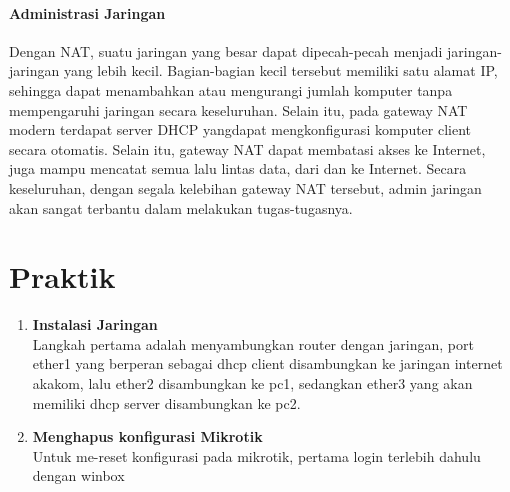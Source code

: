 \documentclass[a4paper,12pt]{article}
\begin{document}
\paragraph{Administrasi Jaringan\\}
Dengan NAT, suatu jaringan yang besar dapat dipecah-pecah menjadi jaringan-
jaringan yang lebih kecil. Bagian-bagian kecil tersebut memiliki satu alamat IP, sehingga
dapat menambahkan atau mengurangi jumlah komputer tanpa mempengaruhi jaringan
secara keseluruhan. Selain itu, pada gateway NAT modern terdapat server DHCP yangdapat mengkonfigurasi komputer client secara otomatis. Selain itu, gateway NAT dapat
membatasi akses ke Internet, juga mampu mencatat semua lalu lintas data, dari dan ke
Internet. Secara keseluruhan, dengan segala kelebihan gateway NAT tersebut, admin
jaringan akan sangat terbantu dalam melakukan tugas-tugasnya.

\section{Praktik}
\begin{enumerate}
	\item \textbf{Instalasi Jaringan}\\
	Langkah pertama adalah menyambungkan router dengan jaringan, port ether1 yang berperan sebagai dhcp client disambungkan ke jaringan internet akakom, lalu ether2 disambungkan ke pc1, sedangkan ether3 yang akan memiliki dhcp server disambungkan ke pc2.
	
	\item \textbf{Menghapus konfigurasi Mikrotik}\\
	Untuk me-reset konfigurasi pada mikrotik, pertama login terlebih dahulu dengan winbox
\end{enumerate}
\end{document}

